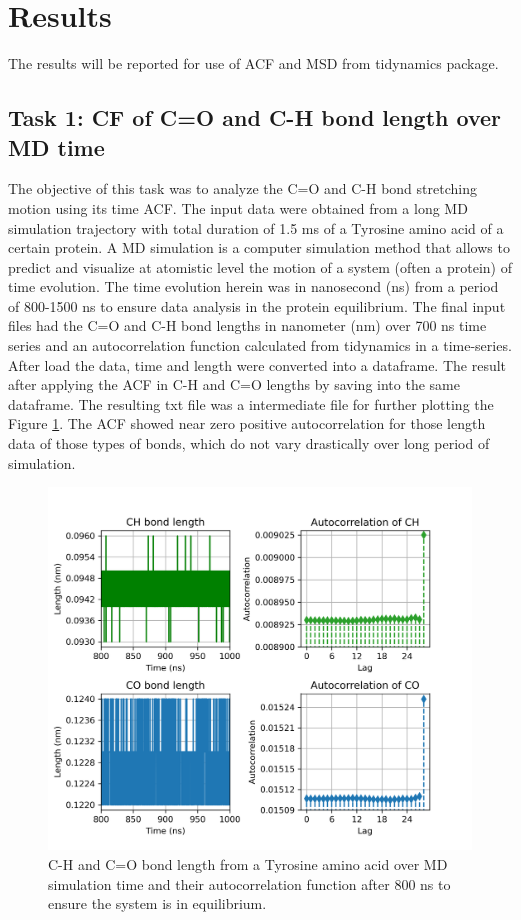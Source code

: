 \documentclass{article}
\begin{document}
\section{Results}

The results will be reported for use of ACF and MSD from tidynamics package\cite{Buyl2018}.

\subsection{Task 1: CF of C=O and C-H bond length over MD time}

The objective of this task was to analyze the C=O and C-H bond stretching motion using its time ACF. The input data were obtained from a long MD simulation trajectory with total duration of 1.5 ms of a Tyrosine amino acid of a certain protein. A MD simulation is a computer simulation method that allows to predict and visualize at atomistic level the motion of a system (often a protein) of time evolution. The time evolution herein was in nanosecond (ns) from a period of 800-1500 ns to ensure data analysis in the protein equilibrium. The final input files had the C=O and C-H bond lengths in nanometer (nm) over 700 ns time series and an autocorrelation function calculated from tidynamics \cite{Buyl2018}in a time-series. After load the data, time and length were converted into a dataframe. The result after applying the ACF in C-H and C=O lengths by saving into the same dataframe. The resulting txt file was a intermediate file for further plotting the Figure \ref{acf_plot}. The ACF showed near zero positive autocorrelation for those length data of those types of bonds, which do not vary drastically over long period of simulation.

\begin{figure}[H]
\includegraphics[width=\linewidth]{CO_CH_length_acf_plot.png}
\caption{C-H and C=O bond length from a Tyrosine amino acid over MD simulation time and their autocorrelation function after 800 ns to ensure the system is in equilibrium.}
\label{acf_plot}
\end{figure}
\end{document}
